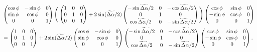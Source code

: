 \documentclass[]{article}
\begin{document}
\begin{align}
&\begin{pmatrix} 
  \cos\phi  & -\sin\phi &  0 \\
  \sin\phi  &  \cos\phi &  0 \\
    0       &     0     &  1
\end{pmatrix} 
\Bigg(
\begin{pmatrix} 
  1  &  0  &  0  \\
  0  &  1  &  0  \\
  0  &  0  &  1  
\end{pmatrix}
 +
 2\sin(\widetilde{\Delta\alpha}/2)
\begin{pmatrix} 
 -\sin\widetilde{\Delta\alpha}/2 &  0  & -\cos\widetilde{\Delta\alpha}/2  \\
             0                   &  1  &              0                   \\
  \cos\widetilde{\Delta\alpha}/2 &  0  & -\sin\widetilde{\Delta\alpha}/2
\end{pmatrix}
\Bigg)
\begin{pmatrix} 
  \cos\phi &  \sin\phi  &  0 \\
 -\sin\phi &  \cos\phi  &  0 \\
    0      &     0      &  1
\end{pmatrix}         \notag\\
&=
\begin{pmatrix} 
  1  &  0  &  0  \\
  0  &  1  &  0  \\
  0  &  0  &  1  
\end{pmatrix}
+ 
2\sin(\widetilde{\Delta\alpha}/2)
\begin{pmatrix} 
  \cos\phi  & -\sin\phi &  0 \\
  \sin\phi  &  \cos\phi &  0 \\
    0       &     0     &  1
\end{pmatrix} 
\begin{pmatrix} 
 -\sin\widetilde{\Delta\alpha}/2 &  0  & -\cos\widetilde{\Delta\alpha}/2  \\
             0                   &  1  &              0                   \\
  \cos\widetilde{\Delta\alpha}/2 &  0  & -\sin\widetilde{\Delta\alpha}/2
\end{pmatrix}
\begin{pmatrix} 
  \cos\phi &  \sin\phi  &  0 \\
 -\sin\phi &  \cos\phi  &  0 \\
    0      &     0      &  1
\end{pmatrix}.
\label{eq:ThinEl.4p}
\end{align}
\end{document}
